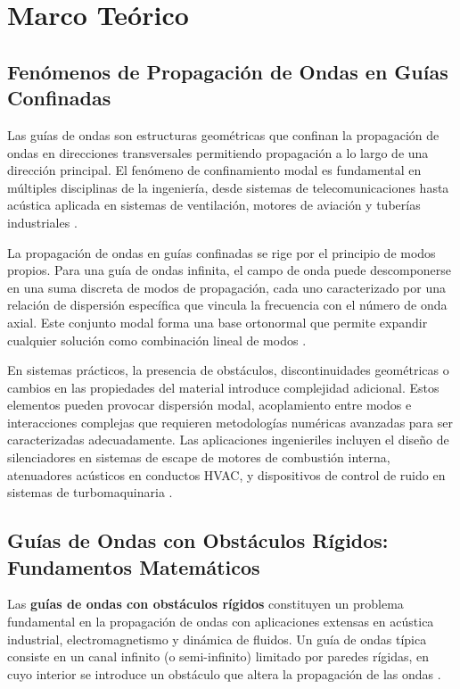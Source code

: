 \documentclass[11pt]{article}
\begin{document}
\section{Marco Teórico}

\subsection{Fenómenos de Propagación de Ondas en Guías Confinadas}

Las guías de ondas son estructuras geométricas que confinan la propagación de ondas en direcciones transversales permitiendo propagación a lo largo de una dirección principal. El fenómeno de confinamiento modal es fundamental en múltiples disciplinas de la ingeniería, desde sistemas de telecomunicaciones hasta acústica aplicada en sistemas de ventilación, motores de aviación y tuberías industriales \cite{Rienstra2015}.

La propagación de ondas en guías confinadas se rige por el principio de modos propios. Para una guía de ondas infinita, el campo de onda puede descomponerse en una suma discreta de modos de propagación, cada uno caracterizado por una relación de dispersión específica que vincula la frecuencia con el número de onda axial. Este conjunto modal forma una base ortonormal que permite expandir cualquier solución como combinación lineal de modos \cite{Dostart2017}.

En sistemas prácticos, la presencia de obstáculos, discontinuidades geométricas o cambios en las propiedades del material introduce complejidad adicional. Estos elementos pueden provocar dispersión modal, acoplamiento entre modos e interacciones complejas que requieren metodologías numéricas avanzadas para ser caracterizadas adecuadamente. Las aplicaciones ingenieriles incluyen el diseño de silenciadores en sistemas de escape de motores de combustión interna, atenuadores acústicos en conductos HVAC, y dispositivos de control de ruido en sistemas de turbomaquinaria \cite{Kirby2005, Rämmal2009}.

\subsection{Guías de Ondas con Obstáculos Rígidos: Fundamentos Matemáticos}

Las \textbf{guías de ondas con obstáculos rígidos} constituyen un problema fundamental en la propagación de ondas con aplicaciones extensas en acústica industrial, electromagnetismo y dinámica de fluidos. Un guía de ondas típica consiste en un canal infinito (o semi-infinito) limitado por paredes rígidas, en cuyo interior se introduce un obstáculo que altera la propagación de las ondas \cite{Linton2008, Pagneux2007, Khallaf2000}.
\end{document}
